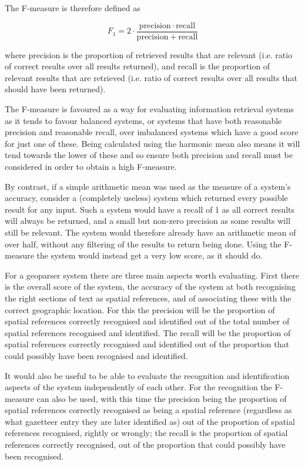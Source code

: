 \documentclass[12pt, a4paper]{report}
\begin{document}
The F-measure is therefore defined as

\begin{displaymath}
	F_{1} = 2 \cdot \frac{\mathrm{precision} \cdot \mathrm{recall}}{\mathrm{precision} + \mathrm{recall}}
\end{displaymath}

where precision is the proportion of retrieved results that are relevant (i.e. ratio of correct results over all results returned), and recall is the proportion of relevant results that are retrieved (i.e. ratio of correct results over all results that should have been returned).

The F-measure is favoured as a way for evaluating information retrieval systems as it tends to favour balanced systems, or systems that have both reasonable precision and reasonable recall, over imbalanced systems which have a good score for just one of these. Being calculated using the harmonic mean also means it will tend towards the lower of these and so ensure both precision and recall must be considered in order to obtain a high F-measure.

By contrast, if a simple arithmetic mean was used as the measure of a system's accuracy, consider a (completely useless) system which returned every possible result for any input. Such a system would have a recall of 1 as all correct results will always be returned, and a small but non-zero precision as some results will still be relevant. The system would therefore already have an arithmetic mean of over half, without any filtering of the results to return being done. Using the F-measure the system would instead get a very low score, as it should do.

For a geoparser system there are three main aspects worth evaluating. First there is the overall score of the system, the accuracy of the system at both recognising the right sections of text as spatial references, and of associating these with the correct geographic location. For this the precision will be the proportion of spatial references correctly recognised and identified out of the total number of spatial references recognised and identified. The recall will be the proportion of spatial references correctly recognised and identified out of the proportion that could possibly have been recognised and identified.

It would also be useful to be able to evaluate the recognition and identification aspects of the system independently of each other. For the recognition the F-measure can also be used, with this time the precision being the proportion of spatial references correctly recognised as being a spatial reference (regardless as what gazetteer entry they are later identified as) out of the proportion of spatial references recognised, rightly or wrongly; the recall is the proportion of spatial references correctly recognised, out of the proportion that could possibly have been recognised.
\end{document}
